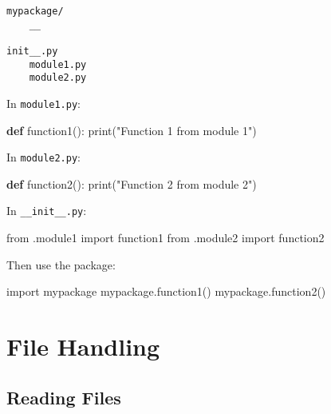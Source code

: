 \documentclass[
  letterpaper,
  DIV=11,
  numbers=noendperiod]{scrreprt}
\newenvironment{Shaded}{\begin{snugshade}}{\end{snugshade}}
\newcommand{\BuiltInTok}[1]{\textcolor[rgb]{0.00,0.23,0.31}{#1}}
\newcommand{\ImportTok}[1]{\textcolor[rgb]{0.00,0.46,0.62}{#1}}
\newcommand{\KeywordTok}[1]{\textcolor[rgb]{0.00,0.23,0.31}{\textbf{#1}}}
\newcommand{\NormalTok}[1]{\textcolor[rgb]{0.00,0.23,0.31}{#1}}
\newcommand{\StringTok}[1]{\textcolor[rgb]{0.13,0.47,0.30}{#1}}
\begin{document}
\begin{verbatim}
mypackage/
    __

init__.py
    module1.py
    module2.py
\end{verbatim}

In \texttt{module1.py}:

\begin{Shaded}
\begin{Highlighting}[]
\KeywordTok{def}\NormalTok{ function1():}
    \BuiltInTok{print}\NormalTok{(}\StringTok{"Function 1 from module 1"}\NormalTok{)}
\end{Highlighting}
\end{Shaded}

In \texttt{module2.py}:

\begin{Shaded}
\begin{Highlighting}[]
\KeywordTok{def}\NormalTok{ function2():}
    \BuiltInTok{print}\NormalTok{(}\StringTok{"Function 2 from module 2"}\NormalTok{)}
\end{Highlighting}
\end{Shaded}

In \texttt{\_\_init\_\_.py}:

\begin{Shaded}
\begin{Highlighting}[]
\ImportTok{from}\NormalTok{ .module1 }\ImportTok{import}\NormalTok{ function1}
\ImportTok{from}\NormalTok{ .module2 }\ImportTok{import}\NormalTok{ function2}
\end{Highlighting}
\end{Shaded}

Then use the package:

\begin{Shaded}
\begin{Highlighting}[]
\ImportTok{import}\NormalTok{ mypackage}
\NormalTok{mypackage.function1()}
\NormalTok{mypackage.function2()}
\end{Highlighting}
\end{Shaded}

\section{File Handling}\label{file-handling}

\subsection{Reading Files}\label{reading-files}
\end{document}
